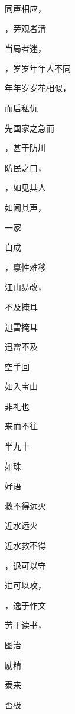 \documentclass[12pt, a4paper, addpoints]{exam}
\begin{document}
\begin{multicols}{2}
\begin{questions}
\question[1] 同声相应，\uline{\qquad\qquad\qquad}

\question[1] \uline{\qquad\qquad\qquad}，旁观者清

\question[1] 当局者迷，\uline{\qquad\qquad\qquad}

\question[1] \uline{\qquad\qquad\qquad}，岁岁年年人不同

\question[1] 年年岁岁花相似，\uline{\qquad\qquad\qquad}

\question[1] \uline{\qquad\qquad\qquad}而后私仇

\question[1] 先国家之急而\uline{\qquad\qquad\qquad}

\question[1] \uline{\qquad\qquad\qquad}，甚于防川

\question[1] 防民之口，\uline{\qquad\qquad\qquad}

\question[1] \uline{\qquad\qquad\qquad}，如见其人

\question[1] 如闻其声，\uline{\qquad\qquad\qquad}

\question[1] \uline{\qquad\qquad\qquad}一家

\question[1] 自成\uline{\qquad\qquad\qquad}

\question[1] \uline{\qquad\qquad\qquad}，禀性难移

\question[1] 江山易改，\uline{\qquad\qquad\qquad}

\question[1] \uline{\qquad\qquad\qquad}不及掩耳

\question[1] 迅雷\uline{\qquad\qquad\qquad}掩耳

\question[1] 迅雷不及\uline{\qquad\qquad\qquad}

\question[1] \uline{\qquad\qquad\qquad}空手回

\question[1] 如入宝山\uline{\qquad\qquad\qquad}

\question[1] \uline{\qquad\qquad\qquad}非礼也

\question[1] 来而不往\uline{\qquad\qquad\qquad}

\question[1] \uline{\qquad\qquad\qquad}半九十

\question[1] \uline{\qquad\qquad\qquad}如珠

\question[1] 好语\uline{\qquad\qquad\qquad}

\question[1] \uline{\qquad\qquad\qquad}救不得远火

\question[1] 近水\uline{\qquad\qquad\qquad}远火

\question[1] 近水救不得\uline{\qquad\qquad\qquad}

\question[1] \uline{\qquad\qquad\qquad}，退可以守

\question[1] 进可以攻，\uline{\qquad\qquad\qquad}

\question[1] \uline{\qquad\qquad\qquad}，逸于作文

\question[1] 劳于读书，\uline{\qquad\qquad\qquad}

\question[1] \uline{\qquad\qquad\qquad}图治

\question[1] 励精\uline{\qquad\qquad\qquad}

\question[1] \uline{\qquad\qquad\qquad}泰来

\question[1] 否极\uline{\qquad\qquad\qquad}

\end{questions}
\end{multicols}
\end{document}
